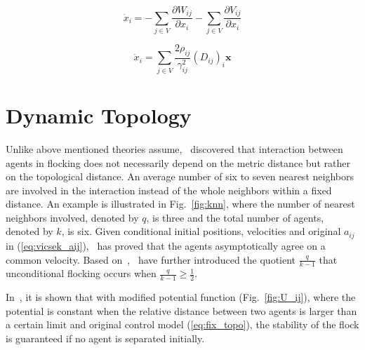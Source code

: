 \begin{equation}\label{eq:connect}
\dot{x}_i=-\sum_{j\in V}\frac{\partial W_{ij}}{\partial x_i}-\sum_{j\in V}\frac{\partial V_{ij}}{\partial x_i}
\end{equation}

\begin{equation}\label{eq:unbound}
\dot{x}_i=\sum_{j\in V}\frac{2\rho_{ij}}{\gamma_{ij}^2}(D_{ij})_i\mathbf{x}
\end{equation}

\section{Dynamic Topology}

Unlike above mentioned theories assume,~\cite{PNAS} discovered that interaction between agents in flocking does not necessarily depend on the metric distance but rather on the topological distance. An average number of six to seven nearest neighbors are involved in the interaction instead of the whole neighbors within a fixed distance. An example is illustrated in Fig.~\ref{fig:knn}, where the number of nearest neighbors involved, denoted by $q$, is three and the total number of agents, denoted by $k$, is six. Given conditional initial positions, velocities and original $a_{ij}$ in (\ref{eq:vicsek_aij}),~\cite{KNN} has proved that the agents asymptotically agree on a common velocity. Based on~\cite{KNN},~\cite{CuckerDong2016} have further introduced the quotient $\frac{q}{k-1}$ that unconditional flocking occurs when $\frac{q}{k-1}\geq\frac{1}{2}$.

In~\cite{DynamicTopology}, it is shown that with modified potential function (Fig.~\ref{fig:U_ij}), where the potential is constant when the relative distance between two agents is larger than a certain limit and original control model (\ref{eq:fix_topo}), the stability of the flock is guaranteed if no agent is separated initially.


